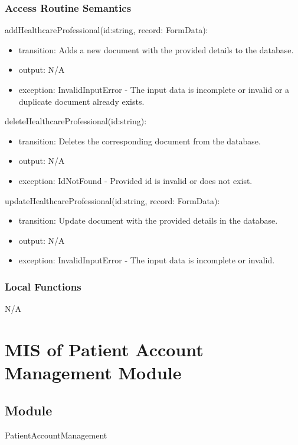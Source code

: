 \documentclass[12pt, titlepage]{article}
\begin{document}
\subsubsection{Access Routine Semantics}

\noindent addHealthcareProfessional(id:string, record: FormData):
\begin{itemize}
\item transition: Adds a new document with the provided details to the database.
\item output: N/A
\item exception: InvalidInputError - The input data is incomplete or invalid or a duplicate document already exists.
\end{itemize}

\noindent deleteHealthcareProfessional(id:string):
\begin{itemize}
\item transition: Deletes the corresponding document from the database.
\item output: N/A
\item exception: IdNotFound - Provided id is invalid or does not exist.
\end{itemize}

\noindent updateHealthcareProfessional(id:string, record: FormData):
\begin{itemize}
\item transition: Update document with the provided details in the database.
\item output: N/A
\item exception: InvalidInputError - The input data is incomplete or invalid.
\end{itemize}

\subsubsection{Local Functions}

N/A

\newpage

\section{MIS of Patient Account Management Module} \label{Module_PatientAccountManag}

\subsection{Module}
PatientAccountManagement
\end{document}
